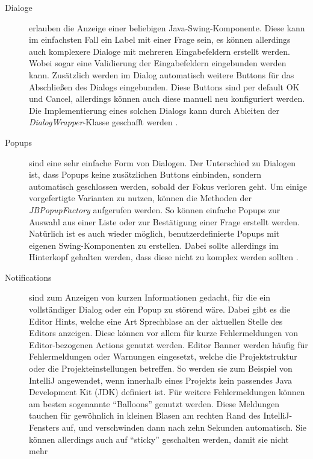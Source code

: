   \begin{description}
    \item[Dialoge] erlauben die Anzeige einer beliebigen Java-Swing-Komponente. 
      Diese kann im einfachsten Fall ein Label mit einer Frage sein, es können allerdings
      auch komplexere Dialoge mit mehreren Eingabefeldern erstellt werden. Wobei
      sogar eine Validierung der Eingabefeldern eingebunden werden kann. Zusätzlich
      werden im Dialog automatisch weitere Buttons für das Abschließen des Dialogs 
      eingebunden. Diese Buttons sind per default OK und Cancel, allerdings können auch
      diese manuell neu konfiguriert werden. Die Implementierung eines solchen Dialogs
      kann durch Ableiten der \emph{DialogWrapper}-Klasse geschafft werden
      \cite{IntelliJPlatformSDKDialogs}.
    \item[Popups] sind eine sehr einfache Form von Dialogen. Der Unterschied zu Dialogen
      ist, dass Popups keine zusätzlichen Buttons einbinden, sondern automatisch 
      geschlossen werden, sobald der Fokus verloren geht. Um einige vorgefertigte 
      Varianten zu nutzen, können die Methoden der \emph{JBPopupFactory} aufgerufen werden.
      So können einfache Popups zur Auswahl aus einer Liste oder zur Bestätigung einer
      Frage erstellt werden. Natürlich ist es auch wieder möglich, benutzerdefinierte
      Popups mit eigenen Swing-Komponenten zu erstellen. Dabei sollte allerdings im
      Hinterkopf gehalten werden, dass diese nicht zu komplex werden sollten
      \cite{IntelliJPlatformSDKPopups}.
    \item[Notifications] sind zum Anzeigen von kurzen Informationen gedacht, für die
      ein vollständiger Dialog oder ein Popup zu störend wäre. Dabei gibt es die 
      Editor Hints, welche eine Art Sprechblase an der aktuellen Stelle des Editors
      anzeigen. Diese können vor allem für kurze Fehlermeldungen von Editor-bezogenen
      Actions genutzt werden. Editor Banner werden häufig für Fehlermeldungen 
      oder Warnungen eingesetzt, welche die Projektstruktur oder die 
      Projekteinstellungen betreffen. So werden sie zum Beispiel von IntelliJ angewendet, 
      wenn innerhalb eines Projekts kein passendes Java Development Kit (JDK) definiert ist. Für weitere
      Fehlermeldungen können am besten sogenannte \enquote{Balloons} genutzt werden.
      Diese Meldungen tauchen für gewöhnlich in kleinen Blasen am rechten Rand
      des IntelliJ-Fensters auf, und verschwinden dann nach zehn Sekunden automatisch.
      Sie können allerdings auch auf \enquote{sticky} geschalten werden, damit sie nicht mehr

\end{description}
